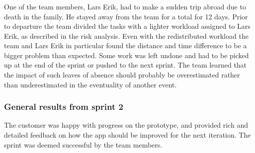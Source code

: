 \subsubsection{}
One of the team members, Lars Erik, had to make a sudden trip abroad due to death in the family. He stayed away from the team for a total for 12 days. Prior to departure the team divided the tasks with a lighter workload assigned to Lars Erik, as described in the risk analysis. Even with the redistributed workload the team and Lars Erik in particular found the distance and time difference to be a bigger problem than expected. Some work was left undone and had to be picked up at the end of the sprint or pushed to the next sprint. The team learned that the impact of such leaves of absence should probably be overestimated rather than underestimated in the eventuality of another event.

\subsubsection{General results from sprint 2}
The customer was happy with progress on the prototype, and provided rich and detailed feedback on how the app should be improved for the next iteration. The sprint was deemed successful by the team members.